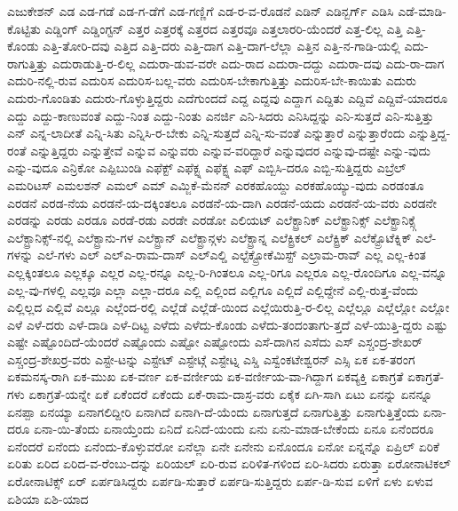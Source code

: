 {ಎಜುಕೇಶನ್
ಎಡ
ಎಡ-ಗಡೆ
ಎಡ-ಗ-ಡೆಗೆ
ಎಡ-ಗಣ್ಣಿಗೆ
ಎಡ-ರ-ವ-ರೊಡನೆ
ಎಡಿನ್
ಎಡಿನ್ಬರ್ಗ್
ಎಡಿಸಿ
ಎಡೆ-ಮಾಡಿ-ಕೊಟ್ಟಿತು
ಎಡ್ಡಿಂಗ್
ಎಡ್ಡಿಂಗ್ಟನ್
ಎತ್ತರ
ಎತ್ತರಕ್ಕೆ
ಎತ್ತರದ
ಎತ್ತರವೂ
ಎತ್ತಲಾರರಿ-ಯೆಂದರೆ
ಎತ್ತ-ಲಿಲ್ಲ
ಎತ್ತಿ
ಎತ್ತಿ-ಕೊಂಡು
ಎತ್ತಿ-ತೋರಿ-ದವು
ಎತ್ತಿದ
ಎತ್ತಿ-ದರು
ಎತ್ತಿ-ದಾಗ
ಎತ್ತಿ-ದಾಗ-ಲೆಲ್ಲಾ
ಎತ್ತಿನ
ಎತ್ತಿ-ನ-ಗಾಡಿ-ಯಲ್ಲಿ
ಎದು-ರಾಗುತ್ತಿತ್ತು
ಎದುರಾಡುತ್ತಿ-ರ-ಲಿಲ್ಲ
ಎದುರಾ-ಡುವ-ವರೇ
ಎದು-ರಾದ
ಎದುರಾ-ದದ್ದು
ಎದುರಾ-ದವು
ಎದು-ರಾ-ದಾಗ
ಎದುರಿ-ನಲ್ಲಿ-ರುವ
ಎದುರಿಸ
ಎದುರಿಸ-ಬಲ್ಲ-ವರು
ಎದುರಿಸ-ಬೇಕಾಗುತ್ತಿತ್ತು
ಎದುರಿಸ-ಬೇ-ಕಾಯಿತು
ಎದುರು
ಎದುರು-ಗೊಂಡಿತು
ಎದುರು-ಗೊಳ್ಳುತ್ತಿದ್ದರು
ಎದೆಗುಂದದೆ
ಎದ್ದ
ಎದ್ದವು
ಎದ್ದಾಗ
ಎದ್ದಿತು
ಎದ್ದಿವೆ
ಎದ್ದಿವೆ-ಯಾದರೂ
ಎದ್ದು
ಎದ್ದು-ಕಾಣುವಂತೆ
ಎದ್ದು-ನಿಂತ
ಎದ್ದು-ನಿಂತು
ಎನರ್ಜಿ
ಎನಿ-ಸಿದರು
ಎನಿಸಿದ್ದನ್ನು
ಎನಿ-ಸುತ್ತದೆ
ಎನಿ-ಸುತ್ತಿತ್ತು
ಎನ್
ಎನ್ನ-ಲಾದೀತೆ
ಎನ್ನಿ-ಸಿತು
ಎನ್ನಿಸಿ-ರ-ಬೇಕು
ಎನ್ನಿ-ಸುತ್ತದೆ
ಎನ್ನಿ-ಸು-ವಂತೆ
ಎನ್ನುತ್ತಾರೆ
ಎನ್ನುತ್ತಾರೆಂದು
ಎನ್ನುತ್ತಿದ್ದ-ರಂತೆ
ಎನ್ನುತ್ತಿದ್ದರು
ಎನ್ನುತ್ತೇವೆ
ಎನ್ನುವ
ಎನ್ನುವರು
ಎನ್ನುವ-ವರಿದ್ದಾರೆ
ಎನ್ನುವುದರ
ಎನ್ನುವು-ದಷ್ಟೇ
ಎನ್ನು-ವುದು
ಎನ್ನು-ವುದೂ
ಎನ್ರಿಕೋ
ಎಪ್ಪಿಬುಂಡಿ
ಎಫೆಕ್ಟ್
ಎಫೆಕ್ಟ್ನ
ಎಫೆಕ್ಟ್ನ
ಎಫ್
ಎಬ್ಬಿಸಿ-ದರೂ
ಎಬ್ಬಿ-ಸುತ್ತಿದ್ದರು
ಎಬ್ರೆಲ್
ಎಮರಿಟಸ್
ಎಮಲಶನ್
ಎಮಲ್
ಎಮ್
ಎಮ್ಜಿಕೆ-ಮೆನನ್
ಎರಕಹೊಯ್ದು
ಎರಕಹೊಯ್ಯು-ವುದು
ಎರಡಂತೂ
ಎರಡನೆ
ಎರಡ-ನೆಯ
ಎರಡನೆ-ಯ-ದಕ್ಕಿಂತಲೂ
ಎರಡನೆ-ಯ-ದಾಗಿ
ಎರಡನೆ-ಯದು
ಎರಡನೆ-ಯ-ವರು
ಎರಡನೇ
ಎರಡನ್ನು
ಎರಡು
ಎರಡೂ
ಎರಡೆ-ರಡು
ಎರಡೇ
ಎರಡೋ
ಎಲಿಯಟ್
ಎಲೆಕ್ಟ್ರಾನಿಕ್
ಎಲೆಕ್ಟ್ರಾನಿಕ್ಸ್
ಎಲೆಕ್ಟ್ರಾನಿಕ್ಸ್ಗೆ
ಎಲೆಕ್ಟ್ರಾನಿಕ್ಸ್-ನಲ್ಲಿ
ಎಲೆಕ್ಟ್ರಾನು-ಗಳ
ಎಲೆಕ್ಟ್ರಾನ್
ಎಲೆಕ್ಟ್ರಾನ್ಗಳು
ಎಲೆಕ್ಟ್ರಾನ್ನ
ಎಲೆಕ್ಟ್ರಿಕಲ್
ಎಲೆಕ್ಟ್ರಿಕ್
ಎಲೆಕ್ಟ್ರೊಟೆಕ್ನಿಕ್
ಎಲೆ-ಗಳನ್ನು
ಎಲೆ-ಗಳು
ಎಲ್
ಎಲ್ಎ-ರಾಮ-ದಾಸ್
ಎಲ್ಎಲ್ಡಿ
ಎಲ್ಟೆಕ್ಟ್ರೋಕೆಮಿಸ್ಟ್
ಎಲ್ರಾಮ-ರಾವ್
ಎಲ್ಲ
ಎಲ್ಲ-ಕಿಂತ
ಎಲ್ಲಕ್ಕಿಂತಲೂ
ಎಲ್ಲಕ್ಕೂ
ಎಲ್ಲರ
ಎಲ್ಲ-ರನ್ನೂ
ಎಲ್ಲ-ರಿ-ಗಿಂತಲೂ
ಎಲ್ಲ-ರಿಗೂ
ಎಲ್ಲರೂ
ಎಲ್ಲ-ರೊಂದಿಗೂ
ಎಲ್ಲ-ವನ್ನೂ
ಎಲ್ಲ-ವು-ಗಳಲ್ಲಿ
ಎಲ್ಲವೂ
ಎಲ್ಲಾ
ಎಲ್ಲಾ-ದರೂ
ಎಲ್ಲಿ
ಎಲ್ಲಿಂದ
ಎಲ್ಲಿಗೂ
ಎಲ್ಲಿದೆ
ಎಲ್ಲಿದ್ದೇನೆ
ಎಲ್ಲಿ-ರುತ್ತ-ವೆಂದು
ಎಲ್ಲಿಲ್ಲದ
ಎಲ್ಲಿವೆ
ಎಲ್ಲೂ
ಎಲ್ಲೆಂದ-ರಲ್ಲಿ
ಎಲ್ಲೆಡೆ
ಎಲ್ಲೆಡೆ-ಯಿಂದ
ಎಲ್ಲೆಯಿರುತ್ತಿ-ರ-ಲಿಲ್ಲ
ಎಲ್ಲೆಲ್ಲೂ
ಎಲ್ಲೆಲ್ಲೋ
ಎಲ್ಲೋ
ಎಳೆ
ಎಳೆ-ದರು
ಎಳೆ-ದಾಡಿ
ಎಳೆ-ದಿಟ್ಟ
ಎಳೆದು
ಎಳೆದು-ಕೊಂಡು
ಎಳೆದು-ತಂದಂತಾಗು-ತ್ತದೆ
ಎಳೆ-ಯುತ್ತಿ-ದ್ದರು
ಎಷ್ಟು
ಎಷ್ಟೇ
ಎಷ್ಟೊಂದಿದೆ-ಯೆಂದರೆ
ಎಷ್ಟೊಂದು
ಎಷ್ಟೋ
ಎಷ್ಟೋಂದು
ಎಸೆ-ದಾಗಿನ
ಎಸೆದು
ಎಸ್
ಎಸ್ಚಂದ್ರ-ಶೇಖರ್
ಎಸ್ಚಂದ್ರ-ಶೇಖರ್ರ-ವರು
ಎಸ್ಟೇ-ಟನ್ನು
ಎಸ್ಟೇಟ್
ಎಸ್ಟೇಟ್ಗೆ
ಎಸ್ಟೇಟ್ನ
ಎಸ್ಡಿ
ಎಸ್ವೆಂಕಟೇಶ್ವರನ್
ಎಸ್ಸಿ
ಏಕ
ಏಕ-ತರಂಗ
ಏಕಮನಸ್ಕ-ರಾಗಿ
ಏಕ-ಮುಖ
ಏಕ-ವರ್ಣ
ಏಕ-ವರ್ಣೀಯ
ಏಕ-ವರ್ಣೀಯ-ವಾ-ಗಿದ್ದಾಗ
ಏಕವ್ಯಕ್ತಿ
ಏಕಾಗ್ರತೆ
ಏಕಾಗ್ರತೆ-ಗಳು
ಏಕಾಗ್ರತೆ-ಯನ್ನೇ
ಏಕೆ
ಏಕೆಂದರೆ
ಏಕೆಂದು
ಏಕೆ-ರಾಮ-ದಾಸ್ರ-ವರು
ಏಕೈಕ
ಏಗಿ-ಸಾಗಿ
ಏಟು
ಏನನ್ನು
ಏನನ್ನೂ
ಏನಪ್ಪಾ
ಏನಯ್ಯಾ
ಏನಾಗಲಿದ್ದೀರಿ
ಏನಾಗಿದೆ
ಏನಾಗಿ-ದೆ-ಯೆಂದು
ಏನಾಗುತ್ತದೆ
ಏನಾಗುತ್ತಿತ್ತು
ಏನಾಗುತ್ತಿತ್ತೆಂದು
ಏನಾ-ದರೂ
ಏನಾ-ಯಿ-ತೆಂದು
ಏನಾಯ್ತೆಂದು
ಏನಿದೆ
ಏನಿದೆ-ಯಂದು
ಏನು
ಏನು-ಮಾಡ-ಬೇಕೆಂದು
ಏನೂ
ಏನೆಂದರೂ
ಏನೆಂದರೆ
ಏನೆಂದು
ಏನೆಂದು-ಕೊಳ್ಳುವರೋ
ಏನೆಲ್ಲಾ
ಏನೇ
ಏನೇನು
ಏನೊಂದೂ
ಏನೋ
ಏನ್ನನ್ನೊ
ಏಪ್ರಿಲ್
ಏರಿಕೆ
ಏರಿತು
ಏರಿದ
ಏರಿದ-ವ-ರೆಂಬು-ದನ್ನು
ಏರಿಯಲ್
ಏರಿ-ರುವ
ಏರಿಳಿತ-ಗಳಿಂದ
ಏರಿ-ಸಿದರು
ಏರುತ್ತಾ
ಏರೋನಾಟಿಕಲ್
ಏರೋನಾಟಿಕ್ಸ್
ಏರ್
ಏರ್ಪಡಿಸಿದ್ದರು
ಏರ್ಪಡಿ-ಸುತ್ತಾರೆ
ಏರ್ಪಡಿ-ಸುತ್ತಿದ್ದರು
ಏರ್ಪ-ಡಿ-ಸುವ
ಏಳಿಗೆ
ಏಳು
ಏಳುವ
ಏಶಿಯಾ
ಏಶಿ-ಯಾದ
}

